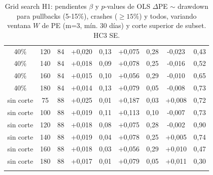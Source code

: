 \begin{longtable}{ccccccccc}
40\% & 120 & 84 & +0{,}020 & 0{,}13 & +0{,}075 & 0{,}28 & -0{,}023 & 0{,}43 \\
40\% & 140 & 84 & +0{,}018 & 0{,}09 & +0{,}078 & 0{,}25 & -0{,}016 & 0{,}52 \\
40\% & 160 & 84 & +0{,}015 & 0{,}10 & +0{,}056 & 0{,}29 & -0{,}010 & 0{,}65 \\
40\% & 180 & 84 & +0{,}014 & 0{,}13 & +0{,}079 & 0{,}05 & -0{,}008 & 0{,}73 \\
sin corte & 75 & 88 & +0{,}025 & 0{,}01 & +0{,}187 & 0{,}03 & +0{,}008 & 0{,}72 \\
sin corte & 100 & 88 & +0{,}019 & 0{,}11 & +0{,}113 & 0{,}10 & -0{,}007 & 0{,}73 \\
sin corte & 120 & 88 & +0{,}018 & 0{,}08 & +0{,}075 & 0{,}28 & -0{,}002 & 0{,}90 \\
sin corte & 140 & 88 & +0{,}019 & 0{,}04 & +0{,}078 & 0{,}25 & +0{,}005 & 0{,}74 \\
sin corte & 160 & 88 & +0{,}018 & 0{,}03 & +0{,}056 & 0{,}29 & +0{,}010 & 0{,}47 \\
sin corte & 180 & 88 & +0{,}017 & 0{,}01 & +0{,}079 & 0{,}05 & +0{,}011 & 0{,}30 \\
\bottomrule
\caption{Grid search H1: pendientes $\beta$ y $p$-values de OLS $\Delta$PE $\sim$ drawdown para pullbacks (5-15\%), crashes ($\geq 15\%$) y todos, variando ventana $W$ de PE (m=3, mín. 30 días) y corte superior de subset. HC3 SE.} \label{tab:e3-h1-grid}
\end{longtable}

